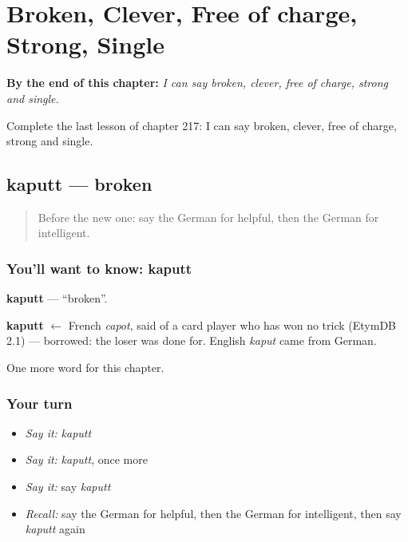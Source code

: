
\chapter{Broken, Clever, Free of charge, Strong, Single}
\label{ch:ge-broken-clever-free-of-charge-strong-single}

\begin{chapteropening}
\textbf{By the end of this chapter:} \emph{I can say broken, clever, free of charge, strong and single.}

Complete the last lesson of chapter 217: I can say broken, clever, free of charge, strong and single.
\end{chapteropening}

\section[kaputt]{kaputt — broken}

\label{lesson:GE-C217-kaputt}



\begin{quote}
Before the new one: say the German for helpful, then the German for intelligent.
\end{quote}

\subsection*{You'll want to know: kaputt}
\textbf{kaputt} — \textquotedblleft{}broken\textquotedblright{}.

\begin{cousinweb}
\textbf{kaputt} $\leftarrow$ French \emph{capot}, said of a card player who has won no trick (EtymDB 2.1) — borrowed: the loser was done for. English \emph{kaput} came from German.
\end{cousinweb}

\begin{grammarlens}[title={What you've built}]
One more word for this chapter.
\end{grammarlens}

\subsection*{Your turn}
\begin{itemize}
\raggedright
  \item \emph{Say it:} \emph{kaputt}
  \item \emph{Say it:} \emph{kaputt}, once more
  \item \emph{Say it:} say \emph{kaputt}
  \item \emph{Recall:} say the German for helpful, then the German for intelligent, then say \emph{kaputt} again
\end{itemize}

